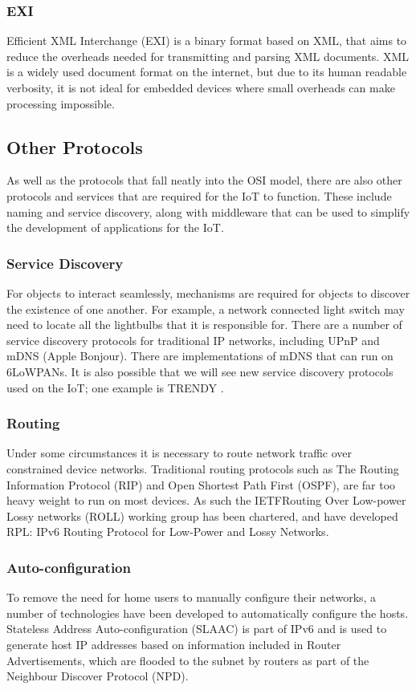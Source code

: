 \documentclass[10pt,journal,compsoc]{IEEEtran}
\begin{document}
\subsubsection{EXI}
Efficient XML Interchange (EXI) is a binary format based on XML, that aims to
reduce the overheads needed for transmitting and parsing XML documents. XML is
a widely used document format on the internet, but due to its human readable
verbosity, it is not ideal for embedded devices where small overheads can make
processing impossible. 

\subsection{Other Protocols}
As well as the protocols that fall neatly into the OSI model, there are also
other protocols and services that are required for the IoT to function. These
include naming and service discovery, along with middleware that can be used to
simplify the development of applications for the IoT.

\subsubsection{Service Discovery}
For objects to interact seamlessly, mechanisms are required for objects to
discover the existence of one another. For example, a network connected light
switch may need to locate all the lightbulbs that it is responsible for. There
are a number of service discovery protocols for traditional IP networks,
including UPnP and mDNS (Apple Bonjour). There are implementations of mDNS
that can run on 6LoWPANs. It is also possible that we will see new service
discovery protocols used on the IoT; one example is TRENDY \cite{Butt2013}. 

\subsubsection{Routing}
Under some circumstances it is necessary to route network traffic over
constrained device networks. Traditional routing protocols such as The Routing
Information Protocol (RIP) and Open Shortest Path First (OSPF), are far too
heavy weight to run on most devices. As such the IETFRouting Over Low-power
Lossy networks (ROLL) working group has been chartered, and have developed RPL:
IPv6 Routing Protocol for Low-Power and Lossy Networks.  

\subsubsection{Auto-configuration}
To remove the need for home users to manually configure their networks, a number of
technologies have been developed to automatically configure the hosts.
Stateless Address Auto-configuration (SLAAC) is part of IPv6 and is used to
generate host IP addresses based on information included in Router
Advertisements, which are flooded to the subnet by routers as part of the
Neighbour Discover Protocol (NPD). 
\end{document}
